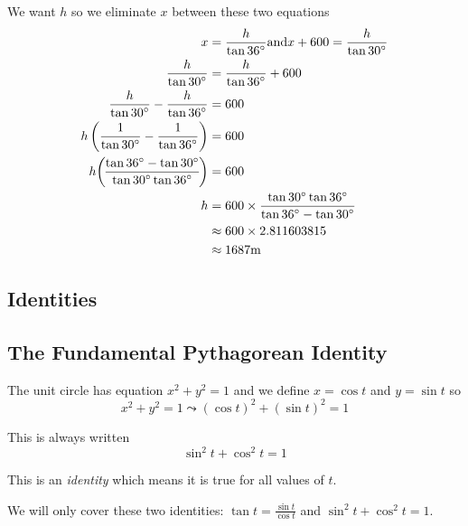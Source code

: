 We want $h$ so we eliminate $x$ between these two equations
\begin{align*}x &  =  \frac{h}{\tan  36 \mbox{{\ensuremath{{}^\circ}}}}\text{and}x +600 =\frac{h}{\tan  30 \mbox{{\ensuremath{{}^\circ}}}} \\
\frac{h}{\tan  30 \mbox{{\ensuremath{{}^\circ}}}} &  =  \frac{h}{\tan  36 \mbox{{\ensuremath{{}^\circ}}}} +600 \\
\frac{h}{\tan  30 \mbox{{\ensuremath{{}^\circ}}}} -\frac{h}{\tan  36 \mbox{{\ensuremath{{}^\circ}}}} &  =  600 \\
h \left (\frac{1}{\tan  30 \mbox{{\ensuremath{{}^\circ}}}} -\frac{1}{\tan  36 \mbox{{\ensuremath{{}^\circ}}}}\right ) &  =  600 \\
h \genfrac{(}{)}{}{}{\tan  36 \mbox{{\ensuremath{{}^\circ}}} -\tan  30 \mbox{{\ensuremath{{}^\circ}}}}{\tan  30 \mbox{{\ensuremath{{}^\circ}}} \tan  36 \mbox{{\ensuremath{{}^\circ}}}} &  =  600 \\
h &  =  600 \times \frac{\tan  30 \mbox{{\ensuremath{{}^\circ}}} \tan  36 \mbox{{\ensuremath{{}^\circ}}}}{\tan  36 \mbox{{\ensuremath{{}^\circ}}} -\tan  30 \mbox{{\ensuremath{{}^\circ}}}} \\
 &  \approx   600 \times 2.811603815 \\
 &  \approx   1687 \mbox{m}\end{align*}

\subsection*{Identities}
\subsection*{The Fundamental Pythagorean Identity}
The unit circle has equation $x^{2} +y^{2} =1$ and we define $x =\cos  t$ and $y =\sin  t$ so
\begin{equation*}x^{2} +y^{2} =1 \leadsto \left (\cos  t\right )^{2} +\left (\sin  t\right )^{2} =1
\end{equation*}

This is always written
\begin{equation*}\sin ^{2} t +\cos ^{2} t =1
\end{equation*}

This is an \emph{identity} which means it is true for all values of $t$. 

We will only cover these two identities: $\tan  t =\frac{\sin  t}{\cos  t}$ and $\sin ^{2} t +\cos ^{2} t =1$. 

